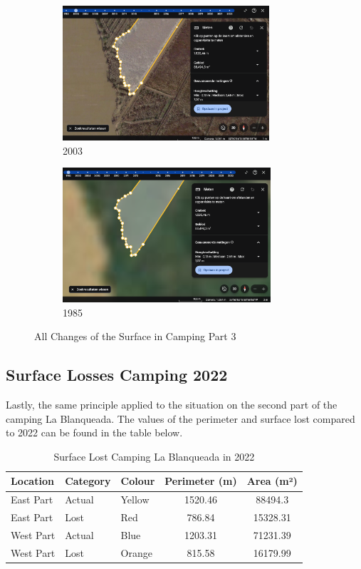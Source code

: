 \begin{figure}[H]
    \centering
    \begin{subfigure}[b]{0.48\textwidth}
        \includegraphics[width=\linewidth, height =5cm]{figures/appendix-g/opp2003.png}
        \caption{2003}
        \label{fig:second}
    \end{subfigure}
    \hfill
    \begin{subfigure}[b]{0.48\textwidth}
        \includegraphics[width=\linewidth, height =5cm]{figures/appendix-g/opp1985.png}
        \caption{1985}
        \label{fig:second}
    \end{subfigure}
        \caption{All Changes of the Surface in Camping Part 3}
    \label{fig:All Changes of the Surface in Camping Part 3}
\end{figure} 

\subsection{Surface Losses Camping 2022}
Lastly, the same principle applied to the situation on the second part of the camping La Blanqueada. The values of the perimeter and surface lost compared to  2022 can be found in the table below. 

\begin{table}[h]
\centering
\caption{Surface Lost Camping La Blanqueada in 2022}
\label{tab:Surface Lost Camping La Blanqueada in 2022}
\begin{tabular}{l l l S[table-format=5.2] S[table-format=5.2]}
\toprule
\textbf{Location} & \textbf{Category} & \textbf{Colour} & \textbf{Perimeter (m)} & \textbf{Area (m²)} \\
\midrule
East Part & Actual & Yellow & 1520.46 & 88494.3 \\
East Part & Lost & Red & 786.84 & 15328.31 \\
West Part & Actual & Blue & 1203.31 & 71231.39 \\
West Part & Lost & Orange & 815.58 & 16179.99 \\
\bottomrule
\end{tabular}
\end{table}


